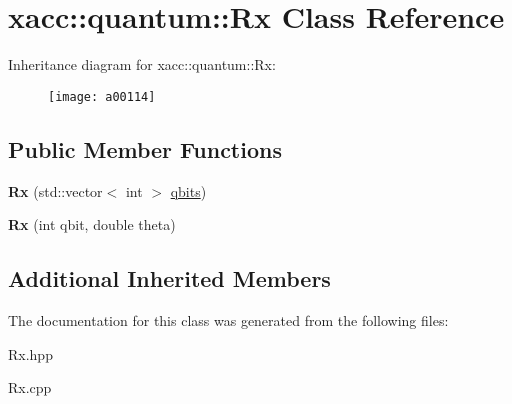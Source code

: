 \hypertarget{a00114}{}\section{xacc\+:\+:quantum\+:\+:Rx Class Reference}
\label{a00114}
Inheritance diagram for xacc\+:\+:quantum\+:\+:Rx\+:\begin{figure}[H]
\begin{center}
\leavevmode
\texttt{[image: a00114]}
\end{center}
\end{figure}
\subsection*{Public Member Functions}
\begin{DoxyCompactItemize}
\item 
{\bfseries Rx} (std\+::vector$<$ int $>$ \hyperlink{a00062_a2a56be6c2519ea65df4d06f4abae1393}{qbits})\hypertarget{a00114_a03babfe938a6cbf7f744fcd31a52d92d}{}\label{a00114_a03babfe938a6cbf7f744fcd31a52d92d}

\item 
{\bfseries Rx} (int qbit, double theta)\hypertarget{a00114_a01667b11d34d5621b98ebff9a07d9bbf}{}\label{a00114_a01667b11d34d5621b98ebff9a07d9bbf}

\end{DoxyCompactItemize}
\subsection*{Additional Inherited Members}


The documentation for this class was generated from the following files\+:\begin{DoxyCompactItemize}
\item 
Rx.\+hpp\item 
Rx.\+cpp\end{DoxyCompactItemize}
